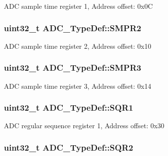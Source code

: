 A\-D\-C sample time register 1, Address offset\-: 0x0\-C \hypertarget{struct_a_d_c___type_def_a9e68fe36c4c8fbbac294b5496ccf7130}{
\subsubsection[{S\-M\-P\-R2}]{ uint32\-\_\-t A\-D\-C\-\_\-\-Type\-Def\-::\-S\-M\-P\-R2}}\label{struct_a_d_c___type_def_a9e68fe36c4c8fbbac294b5496ccf7130}
A\-D\-C sample time register 2, Address offset\-: 0x10 \hypertarget{struct_a_d_c___type_def_abd2c17178853fe4ec3491bab206042d8}{
\subsubsection[{S\-M\-P\-R3}]{ uint32\-\_\-t A\-D\-C\-\_\-\-Type\-Def\-::\-S\-M\-P\-R3}}\label{struct_a_d_c___type_def_abd2c17178853fe4ec3491bab206042d8}
A\-D\-C sample time register 3, Address offset\-: 0x14 \hypertarget{struct_a_d_c___type_def_a0185aa54962ba987f192154fb7a2d673}{
\subsubsection[{S\-Q\-R1}]{ uint32\-\_\-t A\-D\-C\-\_\-\-Type\-Def\-::\-S\-Q\-R1}}\label{struct_a_d_c___type_def_a0185aa54962ba987f192154fb7a2d673}
A\-D\-C regular sequence register 1, Address offset\-: 0x30 \hypertarget{struct_a_d_c___type_def_a6b6e55e6c667042e5a46a76518b73d5a}{
\subsubsection[{S\-Q\-R2}]{ uint32\-\_\-t A\-D\-C\-\_\-\-Type\-Def\-::\-S\-Q\-R2}}\label{struct_a_d_c___type_def_a6b6e55e6c667042e5a46a76518b73d5a}
